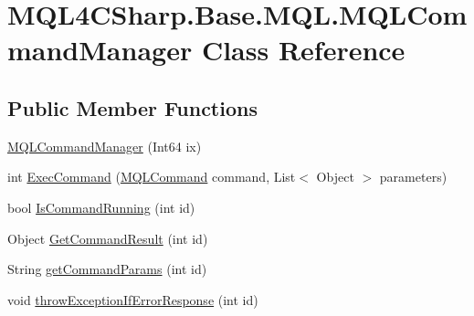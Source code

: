 \hypertarget{class_m_q_l4_c_sharp_1_1_base_1_1_m_q_l_1_1_m_q_l_command_manager}{}\section{M\+Q\+L4\+C\+Sharp.\+Base.\+M\+Q\+L.\+M\+Q\+L\+Command\+Manager Class Reference}
\label{class_m_q_l4_c_sharp_1_1_base_1_1_m_q_l_1_1_m_q_l_command_manager}
\subsection*{Public Member Functions}
\begin{DoxyCompactItemize}
\item 
\hyperlink{class_m_q_l4_c_sharp_1_1_base_1_1_m_q_l_1_1_m_q_l_command_manager_a6280b2a0fb6c1897d12faab2b12416c5}{M\+Q\+L\+Command\+Manager} (Int64 ix)
\item 
int \hyperlink{class_m_q_l4_c_sharp_1_1_base_1_1_m_q_l_1_1_m_q_l_command_manager_aef6778bb3a8b40c5fb897c16a52ed565}{Exec\+Command} (\hyperlink{namespace_m_q_l4_c_sharp_1_1_base_1_1_enums_a86fc232b6f9a036bf9bff2c97fa38439}{M\+Q\+L\+Command} command, List$<$ Object $>$ parameters)
\item 
bool \hyperlink{class_m_q_l4_c_sharp_1_1_base_1_1_m_q_l_1_1_m_q_l_command_manager_ab9bedebb1535b410b9711bf2025fc889}{Is\+Command\+Running} (int id)
\item 
Object \hyperlink{class_m_q_l4_c_sharp_1_1_base_1_1_m_q_l_1_1_m_q_l_command_manager_ab636e18279f9d5348f8d4961a84d9c25}{Get\+Command\+Result} (int id)
\item 
String \hyperlink{class_m_q_l4_c_sharp_1_1_base_1_1_m_q_l_1_1_m_q_l_command_manager_a0c60b37d7e9a018003abe888acef1e26}{get\+Command\+Params} (int id)
\item 
void \hyperlink{class_m_q_l4_c_sharp_1_1_base_1_1_m_q_l_1_1_m_q_l_command_manager_a4eb0770edf84c81bbb5d9ee7d5000cae}{throw\+Exception\+If\+Error\+Response} (int id)
\end{DoxyCompactItemize}
